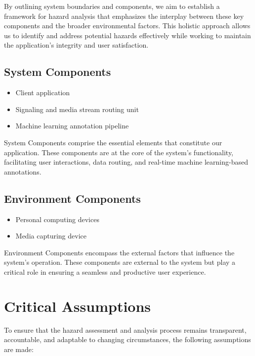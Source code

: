 \documentclass{article}
\begin{document}
By outlining system boundaries and components, we aim to establish a framework
for hazard analysis that emphasizes the interplay between these key components
and the broader environmental factors. This holistic approach allows us to
identify and address potential hazards effectively while working to maintain the
application's integrity and user satisfaction.

\subsection{System Components}
\begin{itemize}
\item Client application
\item Signaling and media stream routing unit
\item Machine learning annotation pipeline
\end{itemize}

System Components comprise the essential elements that constitute our
application. These components are at the core of the system's functionality,
facilitating user interactions, data routing, and real-time machine
learning-based annotations.

\subsection{Environment Components}

\begin{itemize}
\item Personal computing devices
\item Media capturing device
\end{itemize}

Environment Components encompass the external factors that influence the
system's operation. These components are external to the system but play a
critical role in ensuring a seamless and productive user experience.

\section{Critical Assumptions}

To ensure that the hazard assessment and analysis process remains transparent,
accountable, and adaptable to changing circumstances, the following assumptions
are made:
\end{document}
